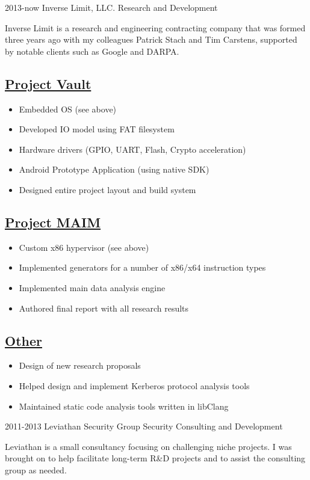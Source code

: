 \documentclass[]{friggeri-cv}
\newcommand{\heading}[1]{
  \vskip 0.05in
  \subsection{\uline{\small{#1}}}
  \vskip 0.05in
}
\begin{document}
\begin{entrylist}
  \entry
    {2013-now}
    {Inverse Limit, LLC.}
    {Research and Development}
    {

      Inverse Limit is a research and engineering contracting company
      that was formed three years ago with my colleagues
      Patrick Stach and Tim Carstens, supported by notable clients
      such as Google and DARPA. 

      \heading{Project Vault}
      
      \begin{itemize}
      \item{Embedded OS (see above)}
      \item{Developed IO model using FAT filesystem}
      \item{Hardware drivers (GPIO, UART, Flash, Crypto acceleration)}
      \item{Android Prototype Application (using native SDK)}
      \item{Designed entire project layout and build system}
      \end{itemize}

      \heading{Project MAIM}
      
      \begin{itemize}
      \item{Custom x86 hypervisor (see above)}
      \item{Implemented generators for a number of x86/x64 instruction types}
      \item{Implemented main data analysis engine}
      \item{Authored final report with all research results}
      \end{itemize}

      \heading{Other}
      
      \begin{itemize}
      \item{Design of new research proposals}
      \item{Helped design and implement Kerberos protocol analysis tools}
      \item{Maintained static code analysis tools written in libClang}
      \end{itemize}
      
    }
  \entry
    {2011-2013}
    {Leviathan Security Group}
    {Security Consulting and Development}
    {

      Leviathan is a small consultancy focusing on challenging niche
      projects. I was brought on to help facilitate long-term R\&D
      projects and to assist the consulting group as needed.
      
}
\end{entrylist}
\end{document}
